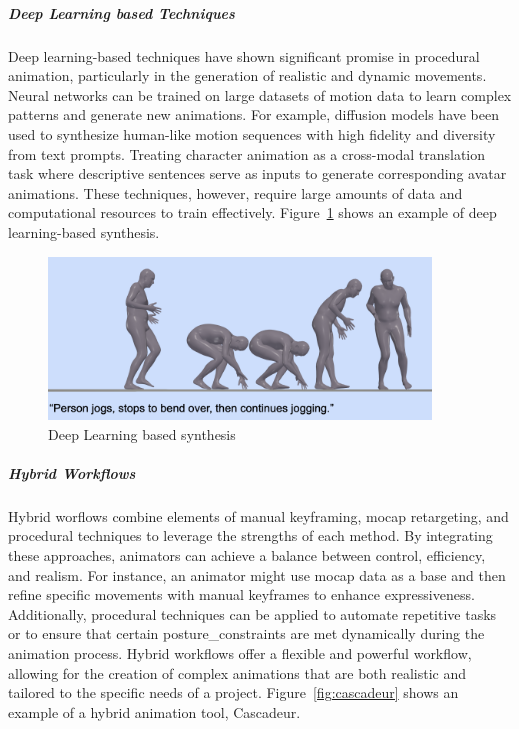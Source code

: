 \documentclass[../../main.tex]{subfiles}
\begin{document}
\subparagraph{Deep Learning based Techniques}
\label{ch:background_work:sign_language_synthesis:3d_techniques:avatar_animation:procedural_techniques:deep_learning_based_techniques}

Deep learning-based techniques have shown significant promise in procedural animation, particularly in the generation of realistic and dynamic movements. Neural networks can be trained on large datasets of motion data to learn complex patterns and generate new animations. For example, diffusion models have been used to synthesize human-like motion sequences with high fidelity and diversity from text prompts. Treating character animation as a cross-modal translation task where descriptive sentences serve as inputs to generate corresponding avatar animations. These techniques, however, require large amounts of data and computational resources to train effectively. Figure~\ref{fig:deep_learning_synthesis} shows an example of deep learning-based synthesis.

\begin{figure} 
  \centering \includegraphics[width = 4in]{chapters/background_work/images/deep_learning_synthesis.png} 
  \caption{Deep Learning based synthesis} 
  \label{fig:deep_learning_synthesis} 
\end{figure}

\subparagraph{Hybrid Workflows}
\label{ch:background_work:sign_language_synthesis:3d_techniques:avatar_animation:procedural_techniques:hybrid_workflows}

Hybrid worflows combine elements of manual keyframing, mocap retargeting, and procedural techniques to leverage the strengths of each method. By integrating these approaches, animators can achieve a balance between control, efficiency, and realism. For instance, an animator might use mocap data as a base and then refine specific movements with manual keyframes to enhance expressiveness. Additionally, procedural techniques can be applied to automate repetitive tasks or to ensure that certain \gls{posture_constraint}s are met dynamically during the animation process. Hybrid workflows offer a flexible and powerful workflow, allowing for the creation of complex animations that are both realistic and tailored to the specific needs of a project. Figure~\ref{fig:cascadeur} shows an example of a hybrid animation tool, Cascadeur.
\end{document}
